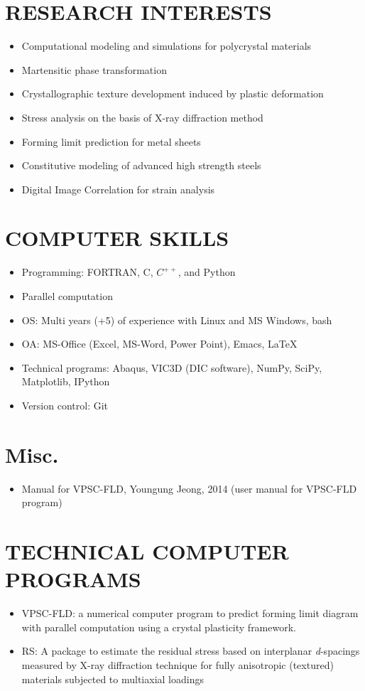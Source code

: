 \documentclass{res}
\begin{document}
\begin{resume}
  \section{RESEARCH INTERESTS}
  \begin{itemize}
  \item Computational modeling and simulations for polycrystal materials
  \item Martensitic phase transformation
  \item Crystallographic texture development induced by plastic deformation
  \item Stress analysis on the basis of X-ray diffraction method
  \item Forming limit prediction for metal sheets
  \item Constitutive modeling of advanced high strength steels
  \item Digital Image Correlation for strain analysis
  \end{itemize}



  \section{COMPUTER SKILLS}
  \begin{itemize}
  \item Programming: FORTRAN, C, $C^{++}$, and Python
  \item Parallel computation
  \item OS: Multi years (+5) of experience with Linux and MS Windows, bash
  \item OA: MS-Office (Excel, MS-Word, Power Point), Emacs, \LaTeX
  \item Technical programs: Abaqus, VIC3D (DIC software), NumPy, SciPy, Matplotlib, IPython
  \item Version control: Git
  \end{itemize}

  \section{Misc.}
  \begin{itemize}
  \item Manual for VPSC-FLD, Youngung Jeong, 2014 (user manual for VPSC-FLD program)
  \end{itemize}
  
  \section{TECHNICAL COMPUTER PROGRAMS}
  \begin{itemize}
  \item VPSC-FLD: a numerical computer program to predict forming limit diagram with parallel computation using a crystal plasticity framework.
  \item RS: A package to estimate the residual stress based on interplanar \emph{d}-spacings measured by X-ray diffraction technique for fully anisotropic (textured) materials subjected to multiaxial loadings
  \end{itemize}


\end{resume}
\end{document}
